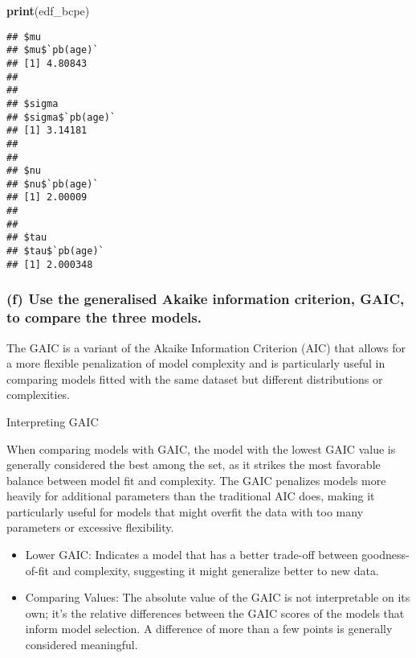 \documentclass[
]{article}
\newenvironment{Shaded}{\begin{snugshade}}{\end{snugshade}}
\newcommand{\FunctionTok}[1]{\textcolor[rgb]{0.13,0.29,0.53}{\textbf{#1}}}
\newcommand{\NormalTok}[1]{#1}
\begin{document}
\begin{Shaded}
\begin{Highlighting}[]
\FunctionTok{print}\NormalTok{(edf\_bcpe)}
\end{Highlighting}
\end{Shaded}

\begin{verbatim}
## $mu
## $mu$`pb(age)`
## [1] 4.80843
## 
## 
## $sigma
## $sigma$`pb(age)`
## [1] 3.14181
## 
## 
## $nu
## $nu$`pb(age)`
## [1] 2.00009
## 
## 
## $tau
## $tau$`pb(age)`
## [1] 2.000348
\end{verbatim}

\hypertarget{f-use-the-generalised-akaike-information-criterion-gaic-to-compare-the-three-models.}{%
\subsubsection{(f) Use the generalised Akaike information criterion,
GAIC, to compare the three
models.}\label{f-use-the-generalised-akaike-information-criterion-gaic-to-compare-the-three-models.}}

The GAIC is a variant of the Akaike Information Criterion (AIC) that
allows for a more flexible penalization of model complexity and is
particularly useful in comparing models fitted with the same dataset but
different distributions or complexities.

Interpreting GAIC

When comparing models with GAIC, the model with the lowest GAIC value is
generally considered the best among the set, as it strikes the most
favorable balance between model fit and complexity. The GAIC penalizes
models more heavily for additional parameters than the traditional AIC
does, making it particularly useful for models that might overfit the
data with too many parameters or excessive flexibility.

\begin{itemize}
\item
  Lower GAIC: Indicates a model that has a better trade-off between
  goodness-of-fit and complexity, suggesting it might generalize better
  to new data.
\item
  Comparing Values: The absolute value of the GAIC is not interpretable
  on its own; it's the relative differences between the GAIC scores of
  the models that inform model selection. A difference of more than a
  few points is generally considered meaningful.
\end{itemize}
\end{document}
